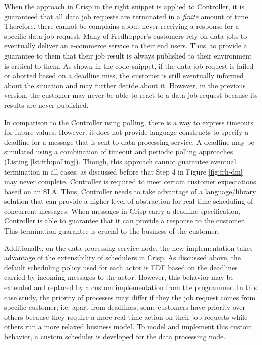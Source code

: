 When the approach in Crisp in the right snippet is applied to Controller, it is guaranteed that all data job requests are terminated in a \emph{finite} amount of time.
Therefore, there cannot be complains about never receiving a response for a specific data job request.
Many of Fredhopper's customers rely on data jobs to eventually deliver an e-commerce service to their end users.
Thus, to provide a guarantee to them that their job result is always published to their environment is critical to them.
As shown in the code snippet, if the data job request is failed or aborted based on a deadline miss, 
the customer is still eventually informed about the situation and may further decide about it.
However, in the previous version, the customer may never be able to react to a data job request because its results are never published.

In comparison to the Controller using polling, there is a way to express timeouts for future values.
However, it does not provide language constructs to specify a deadline for a message that is sent to data processing service.
A deadline may be simulated using a combination of timeout and periodic polling approaches (Listing \ref{lst:frh:polling}).
Though, this approach cannot guarantee eventual termination in all cases; as discussed before that Step 4 in Figure \ref{fig:frh-dm} may never complete.
Controller is required to meet certain customer expectations based on an SLA.
Thus, Controller needs to take advantage of a language/library solution that can provide a higher level of abstraction for real-time scheduling of concurrent messages.
When messages in Crisp carry a deadline specification, Controller is able to guarantee that it can provide a response to the customer.
This termination guarantee is crucial to the business of the customer.

Additionally, on the data processing service node, the new implementation takes advantage of the extensibility of schedulers in Crisp.
As discussed above, the default scheduling policy used for each actor is EDF based on the deadlines carried by incoming messages to the actor.
However, this behavior may be extended and replaced by a custom implementation from the programmer.
In this case study, the priority of processes may differ if they the job request comes from specific customer; i.e.
apart from deadlines, some customers have priority over others because they require a more real-time action on their job requests while others run a more relaxed business model.
To model and implement this custom behavior, a custom scheduler is developed for the data processing node.

